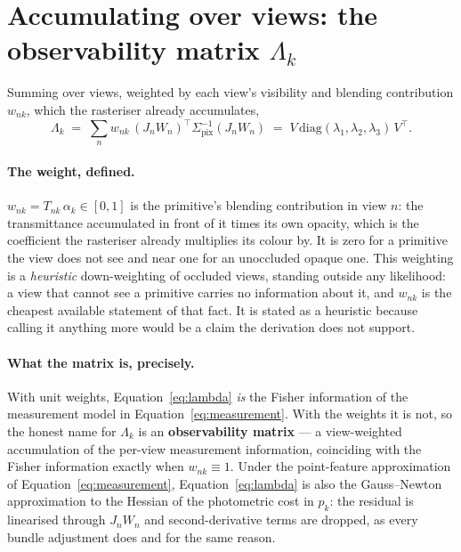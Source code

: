 \section{Accumulating over views: the observability matrix $\Lambda_k$}
\label{sec:accumulation}
Summing over views, weighted by each view's visibility and blending contribution $w_{nk}$, which the rasteriser already accumulates,
\begin{equation}
  \Lambda_k \;=\; \sum_n w_{nk}\,(J_nW_n)^{\!\top}\Sigma_{\mathrm{pix}}^{-1}(J_nW_n)
  \;=\; V\,\mathrm{diag}(\lambda_1,\lambda_2,\lambda_3)\,V^{\!\top}.
  \label{eq:lambda}
\end{equation}

\paragraph{The weight, defined.} $w_{nk} = T_{nk}\,\alpha_k \in [0,1]$ is the
primitive's blending contribution in view $n$: the transmittance accumulated in
front of it times its own opacity, which is the coefficient the rasteriser already multiplies its colour by. It is zero for a primitive the view
does not see and near one for an unoccluded opaque one. This weighting is a \emph{heuristic} down-weighting of occluded views, standing outside any
likelihood:
a view that cannot see a primitive carries no information about it, and $w_{nk}$
is the cheapest available statement of that fact. It is stated as a heuristic
because calling it anything more would be a claim the derivation does not
support.

\paragraph{What the matrix is, precisely.} With unit weights,
Equation~\eqref{eq:lambda} \emph{is} the Fisher information of the measurement
model in Equation~\eqref{eq:measurement}. With the weights it is not, so the
honest name for $\Lambda_k$ is an \textbf{observability matrix} --- a
view-weighted accumulation of the per-view measurement information, coinciding
with the Fisher information exactly when $w_{nk} \equiv 1$. Under the
point-feature approximation of Equation~\eqref{eq:measurement},
Equation~\eqref{eq:lambda} is also the Gauss--Newton approximation to the Hessian
of the photometric cost in $p_k$: the residual is linearised through $J_nW_n$ and second-derivative terms are dropped, as every bundle adjustment does and for
the same reason.

